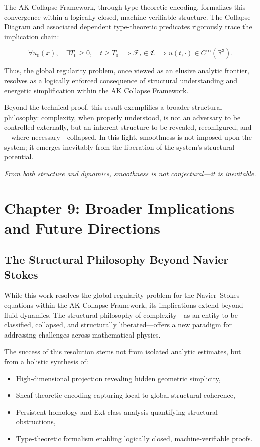 \documentclass[11pt]{article}
\begin{document}
The AK Collapse Framework, through type-theoretic encoding, formalizes this convergence within a logically closed, machine-verifiable structure. The Collapse Diagram and associated dependent type-theoretic predicates rigorously trace the implication chain:

\begin{equation}
\forall u_0(x),\quad \exists T_0 \geq 0,\quad t \geq T_0 \implies \mathcal{F}_t \in \mathfrak{C} \implies u(t, \cdot) \in C^\infty(\mathbb{R}^3).
\end{equation}

Thus, the global regularity problem, once viewed as an elusive analytic frontier, resolves as a logically enforced consequence of structural understanding and energetic simplification within the AK Collapse Framework.

Beyond the technical proof, this result exemplifies a broader structural philosophy: complexity, when properly understood, is not an adversary to be controlled externally, but an inherent structure to be revealed, reconfigured, and---where necessary---collapsed. In this light, smoothness is not imposed upon the system; it emerges inevitably from the liberation of the system's structural potential.

\begin{center}
\emph{From both structure and dynamics, smoothness is not conjectural---it is inevitable.}
\end{center}



\section{Chapter 9: Broader Implications and Future Directions}

\subsection{The Structural Philosophy Beyond Navier--Stokes}

While this work resolves the global regularity problem for the Navier--Stokes equations within the AK Collapse Framework, its implications extend beyond fluid dynamics. The structural philosophy of complexity---as an entity to be classified, collapsed, and structurally liberated---offers a new paradigm for addressing challenges across mathematical physics.

The success of this resolution stems not from isolated analytic estimates, but from a holistic synthesis of:
\begin{itemize}
  \item High-dimensional projection revealing hidden geometric simplicity,
  \item Sheaf-theoretic encoding capturing local-to-global structural coherence,
  \item Persistent homology and Ext-class analysis quantifying structural obstructions,
  \item Type-theoretic formalism enabling logically closed, machine-verifiable proofs.
\end{itemize}
\end{document}
